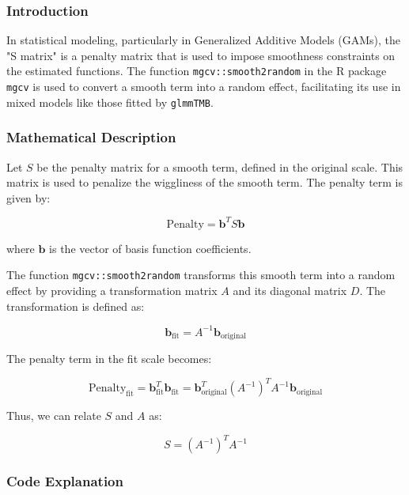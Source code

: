 \documentclass[12pt, twoside,hidelinks]{article}
\theoremstyle{definition}
\numberwithin{equation}{section}
\begin{document}
\subsubsection{Introduction}

In statistical modeling, particularly in Generalized Additive Models (GAMs), the "S matrix" is a penalty matrix that is used to impose smoothness constraints on the estimated functions. The function \texttt{mgcv::smooth2random} in the R package \texttt{mgcv} is used to convert a smooth term into a random effect, facilitating its use in mixed models like those fitted by \texttt{glmmTMB}.

\subsubsection{Mathematical Description}

Let \( S \) be the penalty matrix for a smooth term, defined in the original scale. This matrix is used to penalize the wiggliness of the smooth term. The penalty term is given by:

\[
\text{Penalty} = \mathbf{b}^T S \mathbf{b}
\]

where \( \mathbf{b} \) is the vector of basis function coefficients.

The function \texttt{mgcv::smooth2random} transforms this smooth term into a random effect by providing a transformation matrix \( A \) and its diagonal matrix \( D \). The transformation is defined as:

\[
\mathbf{b}_{\text{fit}} = A^{-1} \mathbf{b}_{\text{original}}
\]

The penalty term in the fit scale becomes:

\[
\text{Penalty}_{\text{fit}} = \mathbf{b}_{\text{fit}}^T \mathbf{b}_{\text{fit}} = \mathbf{b}_{\text{original}}^T (A^{-1})^T A^{-1} \mathbf{b}_{\text{original}}
\]

Thus, we can relate \( S \) and \( A \) as:

\[
S = (A^{-1})^T A^{-1}
\]

\subsubsection{Code Explanation}
\end{document}

